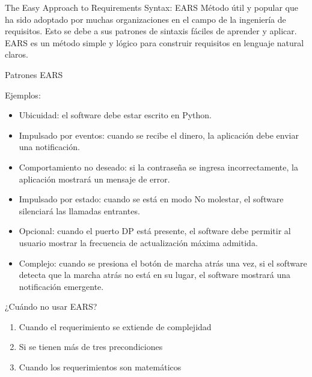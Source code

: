 \documentclass[
  24pt, %
  aspectratio=169, %
]{beamer}
\begin{document}
\begin{frame}{The Easy Approach to Requirements Syntax: EARS}
  Método útil y popular que ha sido adoptado por muchas organizaciones en el campo de la ingeniería de requisitos. Esto se debe a sus patrones de sintaxis fáciles de aprender y aplicar. EARS es un método simple y lógico para construir requisitos en lenguaje natural claros.
\end{frame}

\begin{frame}{Patrones EARS}
  
\end{frame}

\begin{frame}{Ejemplos:}
  \begin{itemize}
  \item Ubicuidad: el software debe estar escrito en Python.
  \item Impulsado por eventos: cuando se recibe el dinero, la aplicación debe enviar una notificación.
  \item Comportamiento no deseado: si la contraseña se ingresa incorrectamente, la aplicación mostrará un mensaje de error.
  \item Impulsado por estado: cuando se está en modo No molestar, el software silenciará las llamadas entrantes.
  \item Opcional: cuando el puerto DP está presente, el software debe permitir al usuario mostrar la frecuencia de actualización máxima admitida.
  \item Complejo: cuando se presiona el botón de marcha atrás una vez, si el software detecta que la marcha atrás no está en su lugar, el software mostrará una notificación emergente.
  \end{itemize}
\end{frame}

\begin{frame}{¿Cuándo no usar EARS?}
  \begin{enumerate}
  \item Cuando el requerimiento se extiende de complejidad
  \item Si se tienen más de tres precondiciones
  \item Cuando los requerimientos son matemáticos
  \end{enumerate}
\end{frame}
\end{document}
